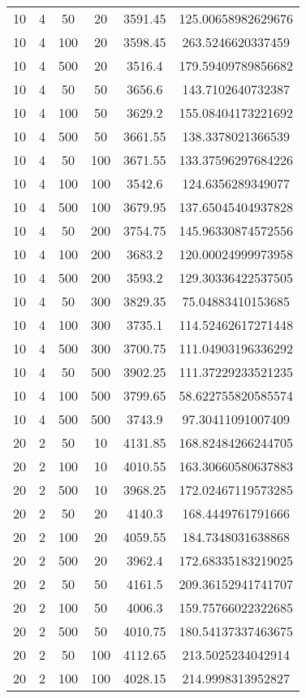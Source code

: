 {\begin{longtabu}{S
S
S
S
S[round-mode=places, round-precision=0]
S[round-mode=places, round-precision=0]}
10 & 4 & 50 & 20 & 3591.45 & 125.00658982629676 \\
10 & 4 & 100 & 20 & 3598.45 & 263.5246620337459 \\
10 & 4 & 500 & 20 & 3516.4 & 179.59409789856682 \\
10 & 4 & 50 & 50 & 3656.6 & 143.7102640732387 \\
10 & 4 & 100 & 50 & 3629.2 & 155.08404173221692 \\
10 & 4 & 500 & 50 & 3661.55 & 138.3378021366539 \\
10 & 4 & 50 & 100 & 3671.55 & 133.37596297684226 \\
10 & 4 & 100 & 100 & 3542.6 & 124.6356289349077 \\
10 & 4 & 500 & 100 & 3679.95 & 137.65045404937828 \\
10 & 4 & 50 & 200 & 3754.75 & 145.96330874572556 \\
10 & 4 & 100 & 200 & 3683.2 & 120.00024999973958 \\
10 & 4 & 500 & 200 & 3593.2 & 129.30336422537505 \\
10 & 4 & 50 & 300 & 3829.35 & 75.04883410153685 \\
10 & 4 & 100 & 300 & 3735.1 & 114.52462617271448 \\
10 & 4 & 500 & 300 & 3700.75 & 111.04903196336292 \\
10 & 4 & 50 & 500 & 3902.25 & 111.37229233521235 \\
10 & 4 & 100 & 500 & 3799.65 & 58.622755820585574 \\
10 & 4 & 500 & 500 & 3743.9 & 97.30411091007409 \\
20 & 2 & 50 & 10 & 4131.85 & 168.82484266244705 \\
20 & 2 & 100 & 10 & 4010.55 & 163.30660580637883 \\
20 & 2 & 500 & 10 & 3968.25 & 172.02467119573285 \\
20 & 2 & 50 & 20 & 4140.3 & 168.4449761791666 \\
20 & 2 & 100 & 20 & 4059.55 & 184.7348031638868 \\
20 & 2 & 500 & 20 & 3962.4 & 172.68335183219025 \\
20 & 2 & 50 & 50 & 4161.5 & 209.36152941741707 \\
20 & 2 & 100 & 50 & 4006.3 & 159.75766022322685 \\
20 & 2 & 500 & 50 & 4010.75 & 180.54137337463675 \\
20 & 2 & 50 & 100 & 4112.65 & 213.5025234042914 \\
20 & 2 & 100 & 100 & 4028.15 & 214.9998313952827 \\

\end{longtabu}}
